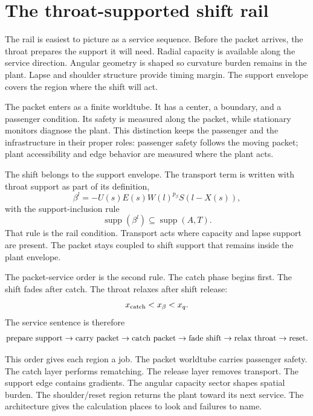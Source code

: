 \documentclass[11pt]{article}
\newcommand{\supp}{\operatorname{supp}}
\begin{document}
\section{The throat-supported shift rail}

The rail is easiest to picture as a service sequence. Before the packet arrives, the throat prepares the support it will need. Radial capacity is available along the service direction. Angular geometry is shaped so curvature burden remains in the plant. Lapse and shoulder structure provide timing margin. The support envelope covers the region where the shift will act.

The packet enters as a finite worldtube. It has a center, a boundary, and a passenger condition. Its safety is measured along the packet, while stationary monitors diagnose the plant. This distinction keeps the passenger and the infrastructure in their proper roles: passenger safety follows the moving packet; plant accessibility and edge behavior are measured where the plant acts.

The shift belongs to the support envelope. The transport term is written with throat support as part of its definition,
\begin{equation}
\beta^l=-U(s)E(s)W(l)^{p_\beta}S(l-X(s)),
\end{equation}
with the support-inclusion rule
\begin{equation}
\supp(\beta^l)\subseteq\supp(A,T).
\end{equation}
That rule is the rail condition. Transport acts where capacity and lapse support are present. The packet stays coupled to shift support that remains inside the plant envelope.

The packet-service order is the second rule. The catch phase begins first. The shift fades after catch. The throat relaxes after shift release:
\begin{equation}
 x_{\rm catch}<x_\beta<x_q.
\end{equation}
The service sentence is therefore
\begin{equation}
\hbox{prepare support}\rightarrow\hbox{carry packet}\rightarrow\hbox{catch packet}\rightarrow\hbox{fade shift}\rightarrow\hbox{relax throat}\rightarrow\hbox{reset}.
\end{equation}

This order gives each region a job. The packet worldtube carries passenger safety. The catch layer performs rematching. The release layer removes transport. The support edge contains gradients. The angular capacity sector shapes spatial burden. The shoulder/reset region returns the plant toward its next service. The architecture gives the calculation places to look and failures to name.
\end{document}
